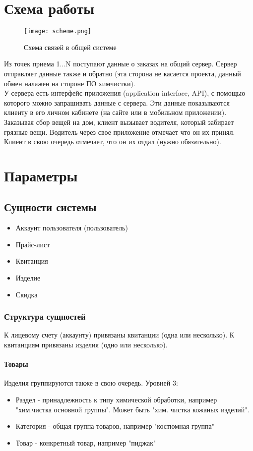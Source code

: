 \documentclass[DIV=calc, paper=a4, fontsize=11pt]{scrartcl} %
\begin{document}
\section{Схема работы}

	\begin{figure}[H]
        \centering
        \texttt{[image: scheme.png]}
        \caption{Схема связей в общей системе\label{fig:scheme.png}}
    \end{figure}
    
Из точек приема 1...N поступают данные о заказах на общий сервер. Сервер отправляет данные также и обратно (эта сторона не касается проекта, данный обмен налажен на стороне ПО химчистки).
\\[0.5cm]
У сервера есть интерфейс приложения (application interface, API), с помощью которого можно запрашивать данные с сервера. Эти данные показываются клиенту в его личном кабинете (на сайте или в мобильном приложении).
\\[0.5cm]
Заказывая сбор вещей на дом, клиент вызывает водителя, который забирает грязные вещи. Водитель через свое приложение отмечает что он их принял. Клиент в свою очередь отмечает, что он их отдал (нужно обязательно).


\section{Параметры}

\subsection{Сущности системы}

\begin{itemize}
	\item Аккаунт пользователя (пользователь)
	\item Прайс-лист
	\item Квитанция
	\item Изделие
	\item Скидка
\end{itemize}

\subsubsection{Структура сущностей}

К лицевому счету (аккаунту) привязаны квитанции (одна или несколько). К квитанциям привязаны изделия (одно или несколько).

\paragraph{Товары}\label{paragraph:goods}
Изделия группируются также в свою очередь. Уровней 3:
\begin{itemize}
	\item Раздел - принадлежность к типу химической обработки, например "хим.чистка основной группы". Может быть "хим. чистка кожаных изделий".
	\item Категория - общая группа товаров, например "костюмная группа"
	\item Товар - конкретный товар, например "пиджак"
\end{itemize}
\end{document}
